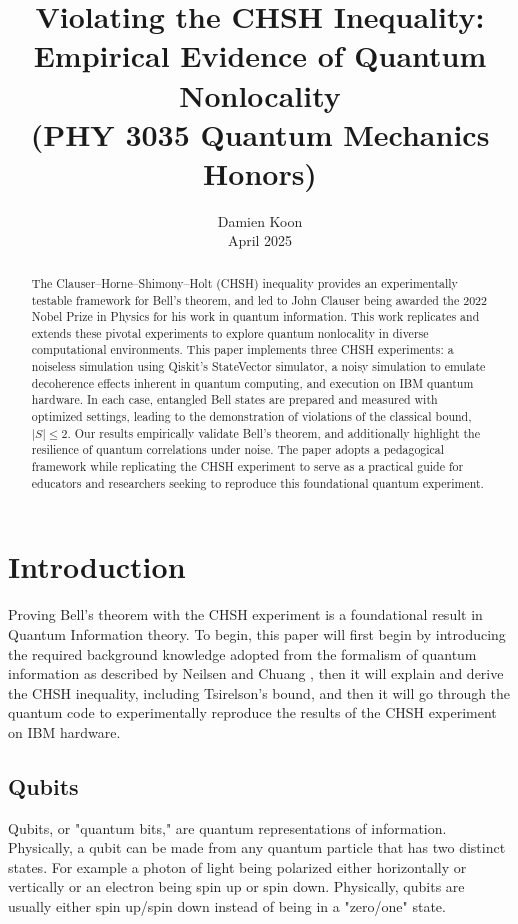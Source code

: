 \documentclass[12pt]{article}
\title{Violating the CHSH Inequality: \\ Empirical Evidence of Quantum Nonlocality \\ (PHY 3035 Quantum Mechanics Honors)}
\author{Damien Koon\\[0.5em]
April 2025} %
\date{} %
\makeatletter
\renewcommand\tableofcontents{%
  \null\hfill\textbf{\Large\contentsname}\hfill\null\par
  \@mkboth{\MakeUppercase\contentsname}{\MakeUppercase\contentsname}%
  \@starttoc{toc}%
}
\makeatother
\begin{document}
\maketitle

\begin{abstract}
The Clauser–Horne–Shimony–Holt (CHSH) inequality provides an experimentally testable framework for Bell's theorem, and led to John Clauser being awarded the 2022 Nobel Prize in Physics for his work in quantum information. This work replicates and extends these pivotal experiments to explore quantum nonlocality in diverse computational environments. This paper implements three CHSH experiments: a noiseless simulation using Qiskit's StateVector simulator, a noisy simulation to emulate decoherence effects inherent in quantum computing, and execution on IBM quantum hardware. In each case, entangled Bell states are prepared and measured with optimized settings, leading to the demonstration of violations of the classical bound, $|S| \leq 2$. Our results empirically validate Bell's theorem, and additionally highlight the resilience of quantum correlations under noise. The paper adopts a pedagogical framework while replicating the CHSH experiment to serve as a practical guide for educators and researchers seeking to reproduce this foundational quantum experiment.
\end{abstract}

\newpage
\tableofcontents
\newpage
\section{Introduction}

Proving Bell's theorem with the CHSH experiment is a foundational result in Quantum Information theory. To begin, this paper will first begin by introducing the required background knowledge adopted from the  formalism of quantum information as described by Neilsen and Chuang \cite{Quantum_Information}, then it will explain and derive the CHSH inequality, including Tsirelson's bound, and then it will go through the quantum code to experimentally reproduce the results of the CHSH experiment on IBM hardware\cite{ibm_quantum}. 

\subsection{Qubits}

Qubits, or "quantum bits," are quantum representations of information. Physically, a qubit can be made from any quantum particle that has two distinct states. For example a photon of light being polarized either horizontally or vertically or an electron being spin up or spin down. Physically, qubits are usually either spin up/spin down instead of being in a "zero/one" state.
\end{document}
